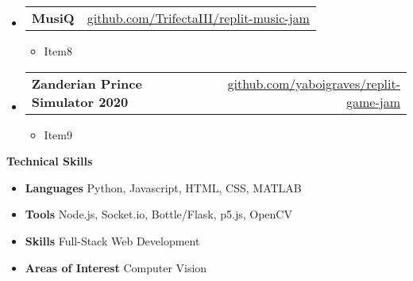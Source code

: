 \documentclass[letterpaper,12pt]{article}[leftmargin=*]
\makeatletter
\def \entryspacing {-0pt}
\renewcommand{\section}[2]{\vspace{5pt}
  \colorbox{secondary}{\color{white}\raggedbottom\normalsize\textbf{{#1}{\hspace{7pt}#2}}}
}
\newcommand{\resumeEntryStart}{\begin{itemize}[leftmargin=2.5mm]}
\newcommand{\resumeEntryEnd}{\end{itemize}\vspace{\entryspacing}}
\newcommand{\resumeItemListStart}{\begin{itemize}[leftmargin=4.5mm]}
\newcommand{\resumeItemListEnd}{\end{itemize}}
\newcommand{\resumeItem}[1]{
  \item\small{
    {#1 \vspace{-2pt}}
  }
}
\newcommand{\resumeEntryTD}[2]{
  \vspace{-1pt}\item[]
    \begin{tabular*}{0.97\textwidth}{l@{\extracolsep{\fill}}r}
      \textbf{\color{primary}#1} & {\firabook\color{accent}\small#2} \\
    \end{tabular*}\vspace{-6pt}
}
\newcommand{\resumeEntryS}[2]{
  \item[]\small{
    \textbf{\color{primary}#1 }{ #2 \vspace{-6pt}}
  }
}
\makeatother
\begin{document}
  \resumeEntryStart
    \resumeEntryTD
      {MusiQ}{\href{https://github.com/TrifectaIII/replit-music-jam}{github.com/TrifectaIII/replit-music-jam}}
    \resumeItemListStart
      \resumeItem {Item8}
    \resumeItemListEnd
  \resumeEntryEnd

  \resumeEntryStart
    \resumeEntryTD
      {Zanderian Prince Simulator 2020}{\href{https://github.com/yaboigraves/replit-game-jam}{github.com/yaboigraves/replit-game-jam}}
    \resumeItemListStart
      \resumeItem {Item9}
    \resumeItemListEnd
  \resumeEntryEnd

\section{\faGears}{Technical Skills}
 \resumeEntryStart
  \resumeEntryS{Languages } {Python, Javascript, HTML, CSS, MATLAB}
  \resumeEntryS{Tools } {Node.js, Socket.io, Bottle/Flask, p5.js, OpenCV}
  \resumeEntryS{Skills } {Full-Stack Web Development}
  \resumeEntryS{Areas of Interest } {Computer Vision}
 \resumeEntryEnd
\end{document}
